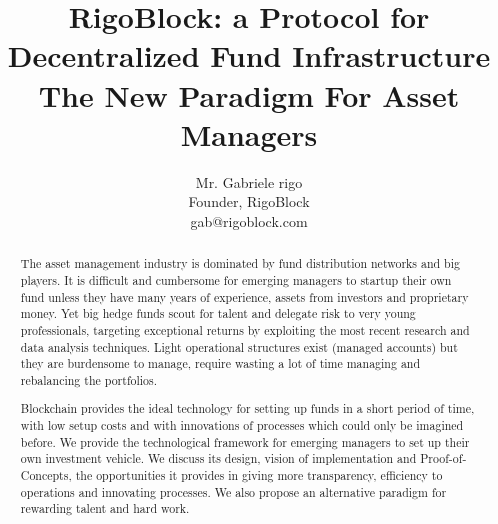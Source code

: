 \documentclass[9pt,oneside]{amsart}
\title{RigoBlock: a Protocol for Decentralized Fund Infrastructure \\ {\smaller \textbf{ The New Paradigm For Asset Managers}}}
\author{
    Mr. Gabriele rigo\\
    Founder, RigoBlock\\
    gab@rigoblock.com
}
\begin{document}
\pagecolor{lightyellow}

\begin{abstract}
The asset management industry is dominated by fund distribution networks and big players. It is difficult and cumbersome for emerging managers to startup their own fund unless they have many years of experience, assets from investors and proprietary money. Yet big hedge funds scout for talent and delegate risk to very young professionals, targeting exceptional returns by exploiting the most recent research and data analysis techniques. Light operational structures exist (managed accounts) but they are burdensome to manage, require wasting a lot of time managing and rebalancing the portfolios.

Blockchain provides the ideal technology for setting up funds in a short period of time, with low setup costs and with innovations of processes which could only be imagined before. We provide the technological framework for emerging managers to set up their own investment vehicle. We discuss its design, vision of implementation and Proof-of-Concepts, the opportunities it provides in giving more transparency, efficiency to operations and innovating processes. We also propose an alternative paradigm for rewarding talent and hard work.
\end{abstract}

\maketitle
\end{document}

